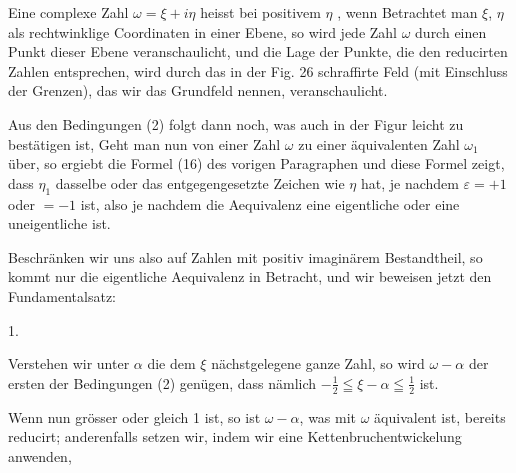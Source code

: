 
Eine complexe Zahl $\omega = \xi + i\eta$ heisst bei positivem $\eta$ , wenn
Betrachtet man $\xi$, $\eta$ als rechtwinklige Coordinaten in einer Ebene, so wird jede Zahl $\omega$ durch einen Punkt dieser Ebene veranschaulicht, und die Lage der Punkte, die den reducirten Zahlen entsprechen, wird durch das in der Fig. 26 schraffirte Feld (mit Einschluss der Grenzen), das wir das Grundfeld nennen, veranschaulicht.


Aus den Bedingungen (2) folgt dann noch, was auch in der Figur leicht zu bestätigen ist,
Geht man nun von einer Zahl $\omega$ zu einer äquivalenten Zahl $\omega_1$ über, so ergiebt die Formel (16) des vorigen Paragraphen
und diese Formel zeigt, dass $\eta_1$ dasselbe oder das entgegengesetzte Zeichen wie $\eta$ hat, je nachdem $\varepsilon = +1$ oder $=-1$ ist, also je nachdem die Aequivalenz eine eigentliche oder eine uneigentliche ist.

Beschränken wir uns also auf Zahlen mit positiv imaginärem Bestandtheil, so kommt nur die eigentliche Aequivalenz in Betracht, und wir beweisen jetzt den Fundamentalsatz:

1. 

Verstehen wir unter $\alpha$ die dem $\xi$ nächstgelegene ganze Zahl, so wird $\omega-\alpha$ der ersten der Bedingungen (2) genügen, dass nämlich $-\tfrac12 \leqq \xi-\alpha \leqq \tfrac12$ ist.

Wenn nun
grösser oder gleich 1 ist, so ist $\omega-\alpha$, was mit $\omega$ äquivalent ist, bereits reducirt; anderenfalls setzen wir, indem wir eine Kettenbruchentwickelung anwenden,
